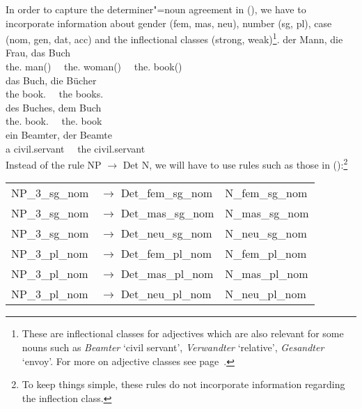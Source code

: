 In order to capture the determiner"=noun agreement in (), we have to incorporate information about gender (fem, mas, neu),
number (sg, pl), case (nom, gen, dat, acc) and the inflectional classes (strong, weak)\footnote{%
These are inflectional classes for adjectives which are also relevant for some nouns such as \emph{Beamter} `civil servant', 
\emph{Verwandter} `relative', \emph{Gesandter} `envoy'.
For more on adjective classes see page~\pageref{page-Flexionsklasse-Wunderlich}.%
}.
\eal\settowidth{}
\ex 
\gll der Mann, die Frau, das Buch\\
	 the.\mas{} man(\mas)~~ the.\fem{} woman(\fem)~~ the.\neu{} book(\neu)\\
\ex 
\gll das Buch, die Bücher\\
	 the book.\SG{}~~ the books.\PL\\
\ex 
\gll des Buches, dem Buch\\
	 the.\gen{} book.\gen{}~~ the.\dat{} book\\
\ex{} 
\gll ein Beamter, der Beamte\\
	 a civil.servant~~ the civil.servant\\
\zl
Instead of the rule NP $\to$ Det N, we will have to use rules such as those in ():\footnote{%
  To keep things simple, these rules do not incorporate information regarding the inflection class.
}
\ea
\begin{tabular}[t]{@{}l@{ }l@{~~}l}
NP\_3\_sg\_nom  & $\to$ Det\_fem\_sg\_nom & N\_fem\_sg\_nom \\
NP\_3\_sg\_nom  & $\to$ Det\_mas\_sg\_nom & N\_mas\_sg\_nom \\
NP\_3\_sg\_nom  & $\to$ Det\_neu\_sg\_nom & N\_neu\_sg\_nom \\
NP\_3\_pl\_nom  & $\to$ Det\_fem\_pl\_nom & N\_fem\_pl\_nom \\
NP\_3\_pl\_nom  & $\to$ Det\_mas\_pl\_nom & N\_mas\_pl\_nom \\
NP\_3\_pl\_nom  & $\to$ Det\_neu\_pl\_nom & N\_neu\_pl\_nom \\[2mm]
\end{tabular}

